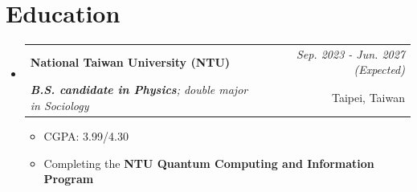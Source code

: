 \documentclass[a4paper,11pt]{article}
\makeatletter
\newcommand{\resumeSubheading}[4]{
\vspace{0.5mm}\item
    \begin{tabular*}{0.98\textwidth}[t]{l@{\extracolsep{\fill}}r}
        \textbf{#1} & \textit{\footnotesize{#4}} \\
        \textit{\footnotesize{#3}} &  \footnotesize{#2}\\
    \end{tabular*}
    \vspace{-2.4mm}
}
\newcommand{\resumeSubHeadingListStart}{\begin{itemize}[leftmargin=*,labelsep=1mm]}
\newcommand{\resumeItemListStart}{\begin{itemize}[leftmargin=*,labelsep=1mm,itemsep=0.5mm]}
\newcommand{\resumeSubHeadingListEnd}{\end{itemize}\vspace{2mm}}
\newcommand{\resumeItemListEnd}{\end{itemize}\vspace{-2mm}}
\makeatother
\begin{document}
\vspace{2mm}


\section{\textbf{Education}}
\vspace{-0.4mm}
\resumeSubHeadingListStart

\resumeSubheading
{National Taiwan University (NTU)}{Taipei, Taiwan}
{\textbf{B.S. candidate in Physics}; double major in Sociology}{Sep. 2023 - Jun. 2027 (Expected)}
\resumeItemListStart
\item CGPA: 3.99/4.30
\item Completing the \textbf{NTU Quantum Computing and Information Program}
\resumeItemListEnd



\resumeSubHeadingListEnd
\vspace{-3mm}
\end{document}
